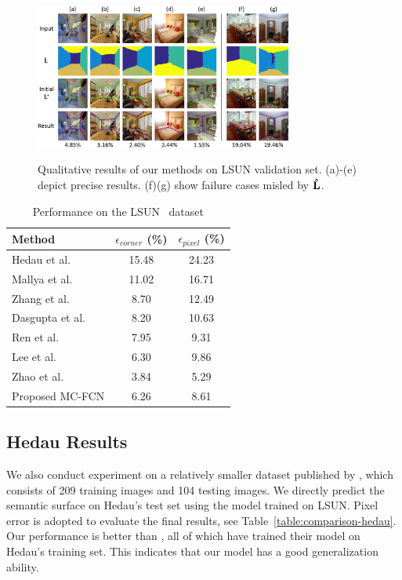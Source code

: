 \begin{figure}[!ht]
	\centering
	\textsc{\includegraphics[width=8.5cm]{figure/qualitive.png}}
	\caption{Qualitative results of our methods on LSUN validation set. (a)-(e) depict precise results. (f)(g) show failure cases misled by $\mathbf{\hat{L}}$. }
	\label{fig:qualitative}
\end{figure}

\begin{table}
	\centering 
	\begin{tabular}{lcc}
		\toprule
		Method & $\epsilon_{corner}$ (\%) & $\epsilon_{pixel}$ (\%) \\
		\midrule
		Hedau et al.~\cite{hedau2009recovering} & 15.48 & 24.23 \\
		Mallya et al.~\cite{mallya2015learning} & 11.02 & 16.71 \\
		Zhang et al.~\cite{zhang2017learning} & 8.70 & 12.49 \\
		Dasgupta et al.~\cite{dasgupta2016delay} & 8.20 & 10.63 \\
		Ren et al.~\cite{ren2016coarse} & 7.95 & 9.31 \\
		Lee et al.~\cite{LeeRoomNet17} & 6.30 & 9.86 \\
		Zhao et al.~\cite{zhao2017physics} & 3.84 & 5.29 \\
		\midrule
		Proposed MC-FCN & 6.26 & 8.61 \\
		\bottomrule
	\end{tabular}
	\caption{Performance on the LSUN~\cite{zhang2015large} dataset}	
	\label{table:comparison-lsun}
\end{table}

\subsection{Hedau Results}
\label{sec:Hedau}
We also conduct experiment on a relatively smaller dataset published by \cite{hedau2009recovering}, which consists of 209 training images and 104 testing images. We directly predict the semantic surface on Hedau's test set using the model trained on LSUN. Pixel error is adopted to evaluate the final results, see Table~\ref{table:comparison-hedau}. Our performance is better than \cite{mallya2015learning,zhang2017learning,ren2016three}, all of which have trained their model on Hedau's training set. This indicates that our model has a good generalization ability.

